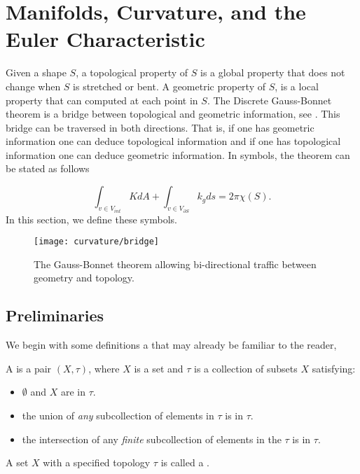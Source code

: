 
\section{Manifolds, Curvature, and the Euler Characteristic}
\label{sec:cast}



Given a shape $S$, a topological property of $S$ is a global property that does
not change when $S$ is stretched or bent.
A geometric property of $S$, is a local property that can computed at each point in $S$.
The Discrete Gauss-Bonnet theorem is a bridge between topological
and geometric information, see . This bridge can be traversed in both directions.
That is, if one has geometric information one can deduce topological information and
if one has topological information one can deduce geometric information.
In symbols, the theorem can be stated as follows

\begin{equation} \label{eqn:g-b}
\int_{v\in V_{int}} K dA + \int_{v\in V_{\partial S}} k_g ds = 2\pi \chi(S).
\end{equation}
In this section, we define these symbols.

\begin{figure}[htb]
\centering
\texttt{[image: curvature/bridge]}
\caption{The Gauss-Bonnet theorem allowing bi-directional traffic
between geometry and topology.}
\label{fig:bridge}
\end{figure}

\subsection{Preliminaries}

We begin with some definitions a that may already be familiar to the reader,
\begin{definition}
A  is a pair $(X,\tau)$, where $X$ is a set and
 $\tau$ is a collection of subsets $X$
satisfying:
	\begin{itemize}
		\item $\emptyset$ and $X$ are in $\tau.$
		\item the union of \emph{any} subcollection of elements in $\tau$ is  in $\tau.$
		\item the intersection of any \emph{finite} subcollection of elements in the $\tau$ is in $\tau.$
	\end{itemize}
A set $X$ with a specified topology $\tau$ is called a .
\end{definition}


